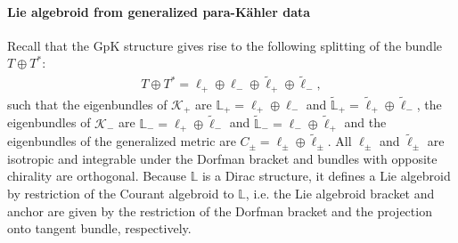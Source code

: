 \documentclass{article}
\newcommand{\TT}{{T\oplus T^*}}
\newcommand{\KK}{\mathcal{K}}
\newcommand{\Lb}{\mathbb{L}}
\newcommand{\ellt}{{\tl{\ell}}}
\def\tl{\tilde}
\theoremstyle{definition}
\theoremstyle{definition}
\theoremstyle{remark}
\begin{document}
\paragraph{Lie algebroid from generalized para-K\"ahler data} Recall that the GpK structure gives rise to the following splitting of the bundle $\TT$:
\begin{align*}
\TT=\ell_+\oplus\ell_-\oplus \ellt_+\oplus \ellt_-,
\end{align*}
such that the eigenbundles of $\KK_+$ are $\Lb_+=\ell_+\oplus\ell_-$ and $\tl{\Lb}_+=\ellt_+\oplus \ellt_-$, the eigenbundles of $\KK_-$ are $\Lb_-=\ell_+\oplus\ellt_-$ and $\tl{\Lb}_-=\ell_-\oplus \ellt_+$ and the eigenbundles of the generalized metric are $C_\pm=\ell_\pm\oplus\ellt_\pm$. All $\ell_\pm$ and $\ellt_\pm$ are isotropic and integrable under the Dorfman bracket and bundles with opposite chirality are orthogonal. Because $\Lb$ is a Dirac structure, it defines a Lie algebroid by restriction of the Courant algebroid to $\Lb$, i.e. the Lie algebroid bracket and anchor are given by the restriction of the Dorfman bracket and the projection onto tangent bundle, respectively.
\end{document}
